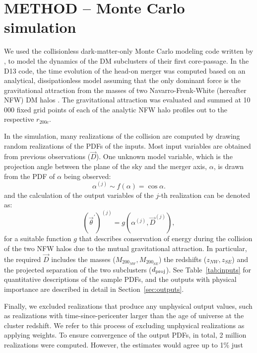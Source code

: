 \documentclass[letterpaper,useAMS,usenatbib]{mn2e}
\begin{document}
\section{METHOD -- Monte Carlo simulation} 
We used the collisionless 
dark-matter-only Monte Carlo modeling code written by , to
model the dynamics of the DM subclusters of their first core-passage.
In the D13 code, the time evolution of the
head-on merger was computed based on an analytical, dissipationless model
assuming that the only dominant force is the gravitational attraction from
the masses of two Navarro-Frenk-White (hereafter NFW) DM halos
\citep{Navarro96}. 
The gravitational attraction was evaluated and summed at 10 000 fixed grid
points of each of the analytic NFW halo profiles out to the respective
$r_{200c}$.\par
In the simulation, many realizations of the collision are
computed by drawing random realizations of the PDFs of the inputs. Most
input variables are obtained from previous observations ($\vec{D}$).  One
unknown model variable, which is the projection angle between the plane of the sky
and the merger axis, $\alpha$, is drawn from the PDF of $\alpha$ being
observed: 
\begin{equation}
	\alpha^{(j)} \sim f(\alpha) = \cos \alpha.
\end{equation}
and the calculation of the output variables of the $j$-th realization can be denoted as: 
\begin{equation}
	(\vec{\theta}^\prime)^{(j)} = g(\alpha^{(j)}, \vec{D}^{(j)}), 
\end{equation}    
for a suitable function $g$ that describes conservation of energy during
the collision of the two NFW halos due to the mutual gravitational
attraction.  In particular, the required $\vec{D}$ includes the masses ($M_{200_{NW}},M_{200_{SE}}$) the redshifts ($z_{NW}, z_{SE}$) and the
projected separation of the two subclusters ($d_{\rm proj}$).  See
Table~\ref{tab:inputs} for quantitative descriptions of the sample PDFs, and
the outputs with physical importance are described in detail in Section~\ref{sec:outputs}. \par
Finally, we excluded realizations that produce any unphysical output
values, such as realizations with time-since-pericenter larger than the age of universe at the
cluster redshift.  We refer to this process of excluding unphysical
realizations as applying weights. 
To ensure convergence of the output PDFs, in total, 2 million realizations
were computed. However, the estimates would agree up to 1\% just 
\end{document}
